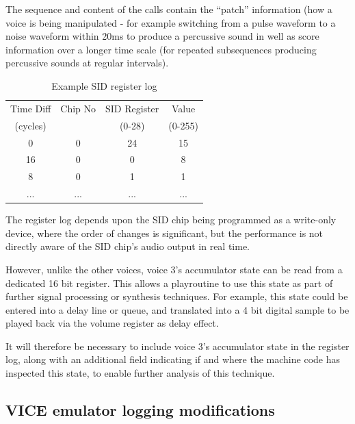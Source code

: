 \documentclass[10pt]{article}
\begin{document}
\begin{multicols*}{2}
The sequence and content of the calls contain the “patch” information (how a voice is being manipulated - for example switching from a pulse waveform to a noise waveform within 20ms to produce a percussive sound in well as score information over a longer time scale (for repeated subsequences producing percussive sounds at regular intervals).

\begin{table}
    \begin{tabular}{|c|c|c|c|}
        \hline
        \rule[-1ex]{0pt}{2.5ex} Time Diff & Chip No & SID Register & Value \\
        \rule[-1ex]{0pt}{2.5ex} (cycles) & & (0-28) & (0-255) \\
        \hline
        \rule[-1ex]{0pt}{2.5ex} 0 & 0 & 24 & 15 \\
        \hline
        \rule[-1ex]{0pt}{2.5ex} 16 & 0 & 0 & 8 \\
        \hline
        \rule[-1ex]{0pt}{2.5ex} 8 & 0 & 1 & 1 \\
        \hline
        \rule[-1ex]{0pt}{2.5ex} ... & ... & ... & ... \\
        \hline
    \end{tabular}
    \caption{Example SID register log}
    \label{table:examplelog}
\end{table}

The register log depends upon the SID chip being programmed as a write-only device, where the order of changes is significant, but the performance is not directly aware of the SID chip’s audio output in real time.

However, unlike the other voices, voice 3’s accumulator state can be read from a dedicated 16 bit register. This allows a playroutine to use this state as part of further signal processing or synthesis techniques. For example, this state could be entered into a delay line or queue, and translated into a 4 bit digital sample to be played back via the volume register as delay effect.

It will therefore be necessary to include voice 3’s accumulator state in the register log, along with an additional field indicating if and where the machine code has inspected this state, to enable further analysis of this technique.

\subsection{VICE emulator logging modifications}


\end{multicols*}
\end{document}

